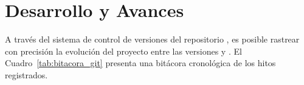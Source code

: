 %
%
%
%

\section{Desarrollo y Avances}
\label{sec:desarrollo}

A través del sistema de control de versiones del repositorio \texttt{\NombreRepo},
es posible rastrear con precisión la evolución del proyecto entre las versiones
\texttt{\VerRef} y \texttt{\VerActual}. El Cuadro~\ref{tab:bitacora_git}
presenta una bitácora cronológica de los hitos registrados.


